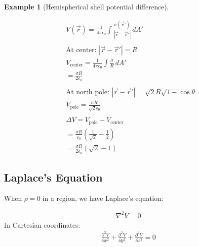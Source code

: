 \documentclass{article}
\newtheorem{example}[theorem]{Example}
\begin{document}
\begin{example}[Hemispherical shell potential difference]
\begin{center}
\begin{minipage}{0.48\textwidth}
\end{minipage}%
\hfill
\begin{minipage}{0.48\textwidth}
    \vspace{0.5em}
    \begin{align*}
        &V(\vec{r}) = \frac{1}{4\pi\epsilon_0} \int \frac{\sigma(\vec{r}')}{|\vec{r} - \vec{r}'|} \, dA' \\
        &\\
        &\text{At center: } |\vec{r} - \vec{r}'| = R \\
        &V_{\text{center}} = \frac{1}{4\pi\epsilon_0} \int \frac{\sigma}{R} \, dA' \\
        &= \frac{\sigma R}{2\epsilon_0} \\
        &\\
        &\text{At north pole: } |\vec{r} - \vec{r}'| = \sqrt{2}R\sqrt{1-\cos\theta} \\
        &V_{\text{pole}} = \frac{\sigma R}{\sqrt{2}\epsilon_0} \\
        &\\
        &\Delta V = V_{\text{pole}} - V_{\text{center}} \\
        &= \frac{\sigma R}{\epsilon_0}\left(\frac{1}{\sqrt{2}} - \frac{1}{2}\right) \\
        &= \frac{\sigma R}{2\epsilon_0}(\sqrt{2} - 1)
    \end{align*}
\end{minipage}
\end{center}
\end{example}

\subsection{Laplace's Equation}
When $\rho = 0$ in a region, we have Laplace's equation:
\begin{conceptbox}
\begin{align*}
    \nabla^2 V = 0
\end{align*}
In Cartesian coordinates:
\begin{align*}
    \frac{\partial^2 V}{\partial x^2} + \frac{\partial^2 V}{\partial y^2} + \frac{\partial^2 V}{\partial z^2} = 0
\end{align*}
\end{conceptbox}
\end{document}
